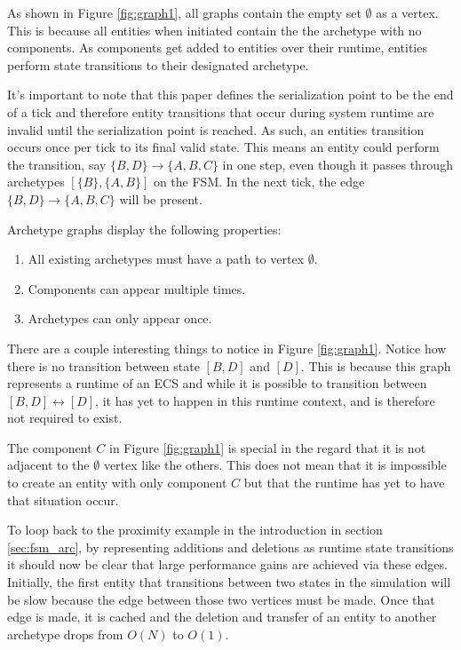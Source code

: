 As shown in Figure \ref{fig:graph1}, all graphs contain the empty set $\emptyset$ as a vertex. This is because all entities when initiated contain the the archetype with no components. As components get added to entities over their runtime, entities perform state transitions to their designated archetype.

It's important to note that this paper defines the serialization point to be the end of a tick and therefore entity transitions that occur during system runtime are invalid until the serialization point is reached. As such, an entities transition occurs once per tick to its final valid state. This means an entity could perform the transition, say $\{B,D\} \rightarrow \{A,B,C\}$ in one step, even though it passes through archetypes $[\{B\}, \{A,B\}]$ on the FSM. In the next tick, the edge $\{B,D\} \rightarrow \{A,B,C\}$ will be present. 

Archetype graphs display the following properties:

\begin{enumerate}
    \item All existing archetypes must have a path to vertex $\emptyset$.
    \item Components can appear multiple times.
    \item Archetypes can only appear once.
\end{enumerate}

There are a couple interesting things to notice in Figure \ref{fig:graph1}. Notice how there is no transition between state $[B,D]$ and $[D]$. This is because this graph represents a runtime of an ECS and while it is possible to transition between $[B,D] \leftrightarrow [D]$, it has yet to happen in this runtime context, and is therefore not required to exist. 

The component $C$ in Figure \ref{fig:graph1} is special in the regard that it is not adjacent to the $\emptyset$ vertex like the others. This does not mean that it is impossible to create an entity with only component $C$ but that the runtime has yet to have that situation occur.

To loop back to the proximity example in the introduction in section \ref{sec:fsm_arc}, by representing additions and deletions as runtime state transitions it should now be clear that large performance gains are achieved via these edges. Initially, the first entity that transitions between two states in the simulation will be slow because the edge between those two vertices must be made. Once that edge is made, it is cached and the deletion and transfer of an entity to another archetype drops from $O(N)$ to $O(1)$.

